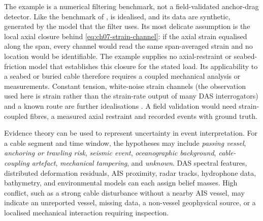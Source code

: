 The example is a numerical filtering benchmark, not a field-validated anchor-drag detector. Like the benchmark of \cite{oliva_quadratic_ejc_2026}, is idealised, and its data are synthetic, generated by the model that the filter uses. Its most delicate assumption is the local axial closure behind \eqref{eq:ch07-strain-channel}: if the axial strain equalised along the span, every channel would read the same span-averaged strain and no location would be identifiable. The example supplies no axial-restraint or seabed-friction model that establishes this closure for the stated load. Its applicability to a seabed or buried cable therefore requires a coupled mechanical analysis or measurements. Constant tension, white-noise strain channels (the observation used here is strain rather than the strain-rate output of many DAS interrogators) and a known route are further idealisations \cite{oliva_quadratic_ejc_2026}. A field validation would need strain-coupled fibres, a measured axial restraint and recorded events with ground truth.


Evidence theory can be used to represent uncertainty in event interpretation. For a cable segment and time window, the hypotheses may include \emph{passing vessel}, \emph{anchoring or trawling risk}, \emph{seismic event}, \emph{oceanographic background}, \emph{cable-coupling artefact}, \emph{mechanical tampering}, and \emph{unknown}. DAS spectral features, distributed deformation residuals, AIS proximity, radar tracks, hydrophone data, bathymetry, and environmental models can each assign belief masses. High conflict, such as a strong cable disturbance without a nearby AIS vessel, may indicate an unreported vessel, missing data, a non-vessel geophysical source, or a localised mechanical interaction requiring inspection.
